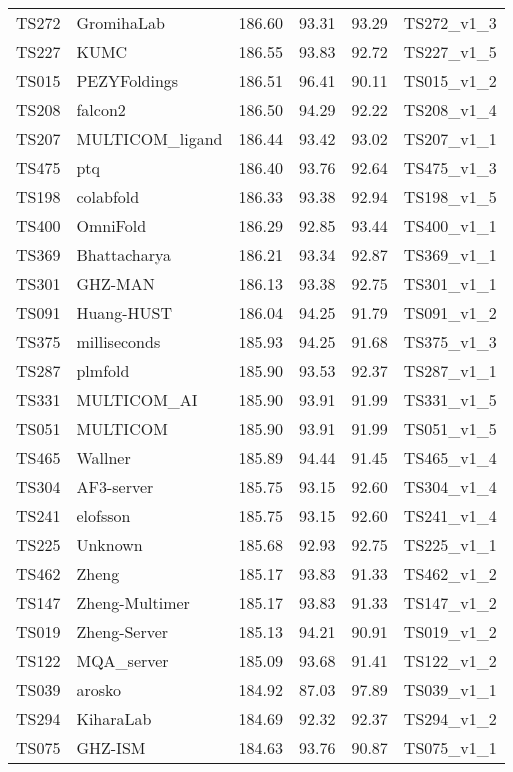 \begin{longtable}{llllll}
TS272 & GromihaLab & 186.60 & 93.31 & 93.29 & TS272\_v1\_3 \\ 
TS227 & KUMC & 186.55 & 93.83 & 92.72 & TS227\_v1\_5 \\ 
TS015 & PEZYFoldings & 186.51 & 96.41 & 90.11 & TS015\_v1\_2 \\ 
TS208 & falcon2 & 186.50 & 94.29 & 92.22 & TS208\_v1\_4 \\ 
TS207 & MULTICOM\_ligand & 186.44 & 93.42 & 93.02 & TS207\_v1\_1 \\ 
TS475 & ptq & 186.40 & 93.76 & 92.64 & TS475\_v1\_3 \\ 
TS198 & colabfold & 186.33 & 93.38 & 92.94 & TS198\_v1\_5 \\ 
TS400 & OmniFold & 186.29 & 92.85 & 93.44 & TS400\_v1\_1 \\ 
TS369 & Bhattacharya & 186.21 & 93.34 & 92.87 & TS369\_v1\_1 \\ 
TS301 & GHZ-MAN & 186.13 & 93.38 & 92.75 & TS301\_v1\_1 \\ 
TS091 & Huang-HUST & 186.04 & 94.25 & 91.79 & TS091\_v1\_2 \\ 
TS375 & milliseconds & 185.93 & 94.25 & 91.68 & TS375\_v1\_3 \\ 
TS287 & plmfold & 185.90 & 93.53 & 92.37 & TS287\_v1\_1 \\ 
TS331 & MULTICOM\_AI & 185.90 & 93.91 & 91.99 & TS331\_v1\_5 \\ 
TS051 & MULTICOM & 185.90 & 93.91 & 91.99 & TS051\_v1\_5 \\ 
TS465 & Wallner & 185.89 & 94.44 & 91.45 & TS465\_v1\_4 \\ 
TS304 & AF3-server & 185.75 & 93.15 & 92.60 & TS304\_v1\_4 \\ 
TS241 & elofsson & 185.75 & 93.15 & 92.60 & TS241\_v1\_4 \\ 
TS225 & Unknown & 185.68 & 92.93 & 92.75 & TS225\_v1\_1 \\ 
TS462 & Zheng & 185.17 & 93.83 & 91.33 & TS462\_v1\_2 \\ 
TS147 & Zheng-Multimer & 185.17 & 93.83 & 91.33 & TS147\_v1\_2 \\ 
TS019 & Zheng-Server & 185.13 & 94.21 & 90.91 & TS019\_v1\_2 \\ 
TS122 & MQA\_server & 185.09 & 93.68 & 91.41 & TS122\_v1\_2 \\ 
TS039 & arosko & 184.92 & 87.03 & 97.89 & TS039\_v1\_1 \\ 
TS294 & KiharaLab & 184.69 & 92.32 & 92.37 & TS294\_v1\_2 \\ 
TS075 & GHZ-ISM & 184.63 & 93.76 & 90.87 & TS075\_v1\_1 \\ 

\end{longtable}
